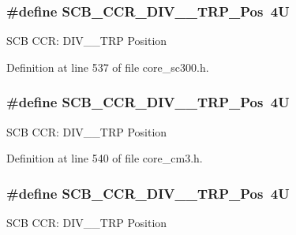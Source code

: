\subsubsection[{\texorpdfstring{S\+C\+B\+\_\+\+C\+C\+R\+\_\+\+D\+I\+V\+\_\+0\+\_\+\+T\+R\+P\+\_\+\+Pos}{SCB_CCR_DIV_0_TRP_Pos}}]{\setlength{\rightskip}{0pt plus 5cm}\#define S\+C\+B\+\_\+\+C\+C\+R\+\_\+\+D\+I\+V\+\_\+\_\+\+T\+R\+P\+\_\+\+Pos~4U}\hypertarget{group___c_m_s_i_s___s_c_b_gac8d512998bb8cd9333fb7627ddf59bba}{}\label{group___c_m_s_i_s___s_c_b_gac8d512998bb8cd9333fb7627ddf59bba}
S\+CB C\+CR\+: D\+I\+V\+\_\+\_\+\+T\+RP Position 

Definition at line 537 of file core\+\_\+sc300.\+h.

\subsubsection[{\texorpdfstring{S\+C\+B\+\_\+\+C\+C\+R\+\_\+\+D\+I\+V\+\_\+0\+\_\+\+T\+R\+P\+\_\+\+Pos}{SCB_CCR_DIV_0_TRP_Pos}}]{\setlength{\rightskip}{0pt plus 5cm}\#define S\+C\+B\+\_\+\+C\+C\+R\+\_\+\+D\+I\+V\+\_\+\_\+\+T\+R\+P\+\_\+\+Pos~4U}\hypertarget{group___c_m_s_i_s___s_c_b_gac8d512998bb8cd9333fb7627ddf59bba}{}\label{group___c_m_s_i_s___s_c_b_gac8d512998bb8cd9333fb7627ddf59bba}
S\+CB C\+CR\+: D\+I\+V\+\_\+\_\+\+T\+RP Position 

Definition at line 540 of file core\+\_\+cm3.\+h.

\subsubsection[{\texorpdfstring{S\+C\+B\+\_\+\+C\+C\+R\+\_\+\+D\+I\+V\+\_\+0\+\_\+\+T\+R\+P\+\_\+\+Pos}{SCB_CCR_DIV_0_TRP_Pos}}]{\setlength{\rightskip}{0pt plus 5cm}\#define S\+C\+B\+\_\+\+C\+C\+R\+\_\+\+D\+I\+V\+\_\+\_\+\+T\+R\+P\+\_\+\+Pos~4U}\hypertarget{group___c_m_s_i_s___s_c_b_gac8d512998bb8cd9333fb7627ddf59bba}{}\label{group___c_m_s_i_s___s_c_b_gac8d512998bb8cd9333fb7627ddf59bba}
S\+CB C\+CR\+: D\+I\+V\+\_\+\_\+\+T\+RP Position 

